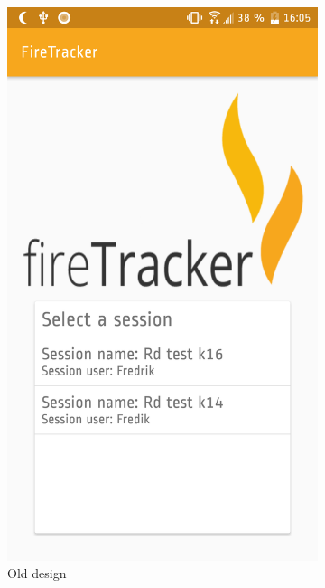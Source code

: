 \documentclass[../Main/thesis.tex]{subfiles}
\begin{document}
\begin{figure}[h]
	\centering
	\begin{subfigure}{0.23\textwidth}
		\includegraphics[width=\textwidth]{../fig/firetracker_app_old_1_noframe}
		\caption{Old design}
		\label{fig:app-old-design-sessionlist-iteration3}
	\end{subfigure}
	\begin{subfigure}{0.23\textwidth}

\end{subfigure}
\end{figure}
\end{document}
